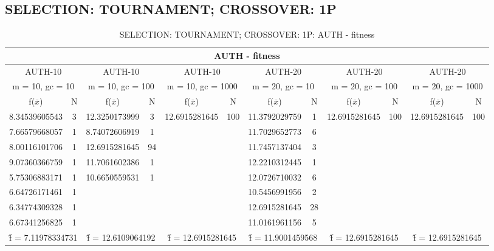 \subsection{SELECTION: TOURNAMENT; CROSSOVER: 1P}
\begin{table}[H]
	\centering
	\caption{SELECTION: TOURNAMENT; CROSSOVER: 1P: AUTH - fitness}
	\begin{adjustbox}{width=1\textwidth}
		\begin{tabular}{ |c|c||c|c||c|c||c|c||c|c||c|c| }
			\hline
			\multicolumn{12}{|c|}{AUTH - fitness} \\
			\hline
			\multicolumn{2}{|c||}{AUTH-10} & \multicolumn{2}{c||}{AUTH-10} & \multicolumn{2}{c||}{AUTH-10} & \multicolumn{2}{c||}{AUTH-20} & \multicolumn{2}{c||}{AUTH-20} & \multicolumn{2}{c|}{AUTH-20}\\
			\hline
			\multicolumn{2}{|c||}{m = 10, gc = 10} & \multicolumn{2}{c||}{m = 10, gc = 100} & \multicolumn{2}{c||}{m = 10, gc = 1000} & \multicolumn{2}{c||}{m = 20, gc = 10} & \multicolumn{2}{c||}{m = 20, gc = 100} & \multicolumn{2}{c|}{m = 20, gc = 1000}\\
			\hline
			f($\bar{x}$) & N & f($\bar{x}$) & N & f($\bar{x}$) & N & f($\bar{x}$) & N & f($\bar{x}$) & N & f($\bar{x}$) & N\\
			\hline
			\hline
			8.34539605543 & 3 & 12.3250173999 & 3 & 12.6915281645 & 100 & 11.3792029759 & 1 & 12.6915281645 & 100 & 12.6915281645 & 100\\
			7.66579668057 & 1 & 8.74072606919 & 1 &   &   & 11.7029652773 & 6 &   &   &   &  \\
			8.00116101706 & 1 & 12.6915281645 & 94 &   &   & 11.7457137404 & 3 &   &   &   &  \\
			9.07360366759 & 1 & 11.7061602386 & 1 &   &   & 12.2210312445 & 1 &   &   &   &  \\
			5.75306883171 & 1 & 10.6650559531 & 1 &   &   & 12.0726710032 & 6 &   &   &   &  \\
			6.64726171461 & 1 &   &   &   &   & 10.5456991956 & 2 &   &   &   &  \\
			6.34774309328 & 1 &   &   &   &   & 12.6915281645 & 28 &   &   &   &  \\
			6.67341256825 & 1 &   &   &   &   & 11.0161961156 & 5 &   &   &   &  \\
			\hline
			\multicolumn{2}{|c||}{\^{f} = 7.11978334731} & \multicolumn{2}{c||}{\^{f} = 12.6109064192} & \multicolumn{2}{c||}{\^{f} = 12.6915281645} & \multicolumn{2}{c||}{\^{f} = 11.9001459568} & \multicolumn{2}{c||}{\^{f} = 12.6915281645} & \multicolumn{2}{c|}{\^{f} = 12.6915281645}\\
			\hline
		\end{tabular}
	\end{adjustbox}
\end{table}

